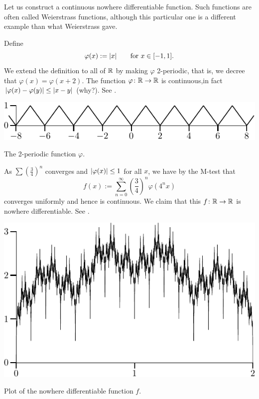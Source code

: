 \begin{example}
Let us construct a continuous nowhere differentiable function.
Such functions are often called Weierstrass functions, although this
particular one is a different example than what Weierstrass gave.

Define
\begin{equation*}
\varphi(x) :=\lvert {x} \rvert \qquad \text{for $x \in [-1,1]$} .
\end{equation*}
We extend the definition to all of ${\mathbb{R}}$ by making $\varphi$ 2-periodic,
that is, we decree that
$\varphi(x) = \varphi(x+2)$.  The function $\varphi \colon {\mathbb{R}} \to {\mathbb{R}}$
is continuous,in fact $\lvert {\varphi(x)-\varphi(y)} \rvert \leq \lvert {x-y} \rvert$ (why?).
See .
\begin{myfigureht}
\includegraphics{figures/triangwave}
\caption{The 2-periodic function $\varphi$.\label{fig:triangwave}}
\end{myfigureht}

As $\sum {\left(\frac{3}{4}\right)}^n$ converges and $\lvert {\varphi(x)} \rvert \leq
1$ for all $x$, we have by the M-test that
\begin{equation*}
f(x) := \sum_{n=0}^\infty 
{\left(\frac{3}{4}\right)}^n \varphi(4^n x)
\end{equation*}
converges uniformly and hence is continuous.  We claim that this $f \colon
{\mathbb{R}} \to {\mathbb{R}}$ is nowhere differentiable.
See .

\begin{myfigureht}
\includegraphics{figures/nowherediff}
\caption{Plot of the nowhere differentiable function $f$.\label{fig:nowherediff}}
\end{myfigureht}


\end{example}
